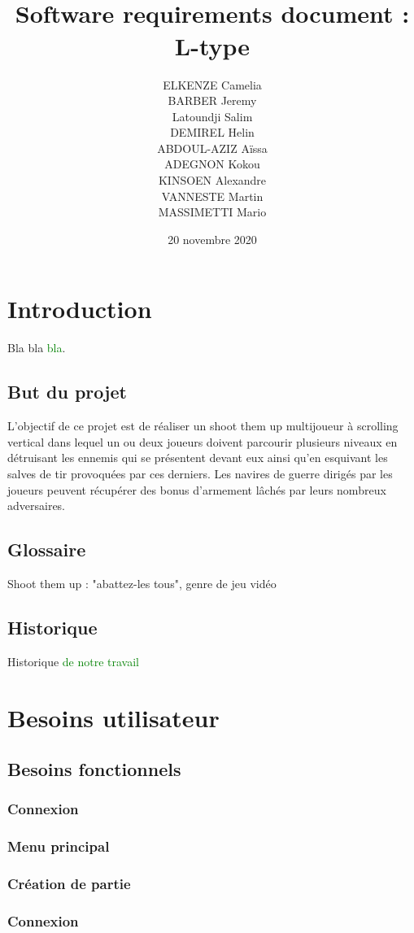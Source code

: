 \documentclass[utf8]{article}
\title{\\[3 cm]\Huge Software requirements document : \\[1 cm] L-type\\[7 cm]}
\author{ELKENZE Camelia\\[0,2 cm] BARBER Jeremy\\[0,2 cm] Latoundji Salim\\[0,2 cm] DEMIREL Helin\\[0,2 cm] ABDOUL-AZIZ Aïssa\\[0,2 cm] ADEGNON Kokou\\[0,2 cm] KINSOEN Alexandre\\[0,2 cm] VANNESTE Martin\\[0,2 cm] MASSIMETTI Mario  }
\date{20 novembre 2020}
\renewcommand*{\emph}[1]{\textcolor{green}{#1}}
\begin{document}
\tableofcontents

\newpage


\section{Introduction}
Bla bla \emph{bla}.

\subsection{But du projet}
L’objectif de ce projet est de réaliser un shoot them up multijoueur à scrolling vertical dans lequel un ou deux joueurs doivent parcourir plusieurs niveaux en détruisant les ennemis qui se présentent devant eux ainsi qu’en esquivant les salves de tir provoquées par ces derniers.
Les navires de guerre dirigés par les joueurs peuvent récupérer des bonus d’armement lâchés par leurs nombreux adversaires.

\subsection{Glossaire}
Shoot them up : "abattez-les tous", genre de jeu vidéo

\subsection{Historique}
Historique \emph{de notre travail}

\section{Besoins utilisateur}
\subsection{Besoins fonctionnels}
\subsubsection{Connexion}
\subsubsection{Menu principal}
\subsubsection{Création de partie}
\subsubsection{Connexion}
\end{document}
